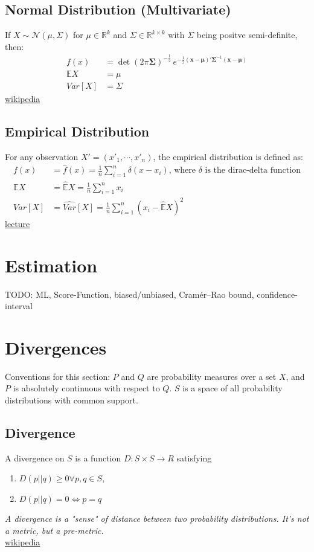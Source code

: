 \subsection{Normal Distribution (Multivariate)}
If $X \sim {\mathcal {N}}(\mu ,\Sigma)$ for $\mu \in \mathbb {R}^k$ and $\Sigma \in \mathbb {R}^{k \times k}$ with $\Sigma$ being positve semi-definite, then:
\begin{align*}
	f(x) &= \operatorname {det} (2\pi {\boldsymbol {\Sigma }})^{-{\frac {1}{2}}}\,e^{-{\frac {1}{2}}(\mathbf {x} -{\boldsymbol {\mu }})'{\boldsymbol {\Sigma }}^{-1}(\mathbf {x} -{\boldsymbol {\mu }})}\\
	\mathbb{E}X &= \mu \\
	Var[X] &= \Sigma
\end{align*}
\href{https://en.wikipedia.org/wiki/Multivariate_normal_distribution}{wikipedia}

\subsection{Empirical Distribution}
For any observation $X'=(x'_1, \cdots, x'_n)$, the empirical distribution is defined as:
\begin{align*}
	f(x) &= \hat{f}(x) =\frac{1}{n}\sum_{i=1}^{n}\delta(x - x_i)\text{, where $\delta$ is the dirac-delta function}\\
	\mathbb{E}X &= \hat{\mathbb{E}}X = \frac{1}{n}\sum_{i=1}^{n}x_i \\
	Var[X] &= \hat{Var}[X] =\frac{1}{n}\sum_{i=1}^{n}(x_i-\hat{\mathbb{E}}X)^2
\end{align*}
\href{http://www.stat.umn.edu/geyer/5102/slides/s1.pdf}{lecture}

\section{Estimation}
TODO: ML, Score-Function, biased/unbiased, Cramér–Rao bound, confidence-interval

\section{Divergences}
Conventions for this section: $P$ and $Q$ are probability measures over a set $X$, and $P$ is absolutely continuous with respect to $Q$. $S$ is a space of all probability distributions with common support.
\subsection{Divergence}
A divergence on $S$ is a function $D: S \times S \rightarrow R$ satisfying
\begin{enumerate}
	\item $D(p || q) \geq 0  \forall p, q \in S$,
	\item $D(p || q) = 0 \Leftrightarrow p = q$
\end{enumerate}
\textit{A divergence is a "sense" of distance between two probability distributions. It's not a metric, but a pre-metric.}\\
\href{https://en.wikipedia.org/wiki/Divergence_(statistics)}{wikipedia}

